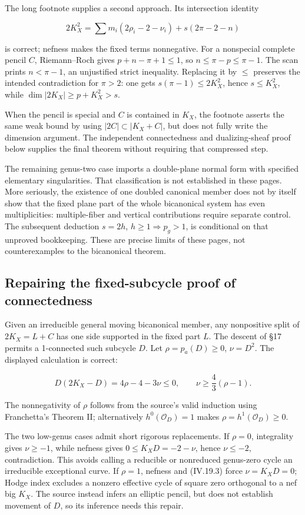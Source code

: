 The long footnote supplies a second approach. Its intersection identity

\[
2K_X^2=\sum m_i(2\rho_i-2-\nu_i)
+s(2\pi-2-n)
\]

is correct; nefness makes the fixed terms nonnegative. For a nonspecial complete pencil \(C\), Riemann--Roch gives \(p+n-\pi+1\le 1\), so \(n\le\pi-p\le\pi-1\). The scan prints \(n<\pi-1\), an unjustified strict inequality. Replacing it by \(\le\) preserves the intended contradiction for \(\pi>2\): one gets \(s(\pi-1)\le 2 K_X^2\), hence \(s\le K_X^2\), while \(\dim|2 K_X|\ge p+K_X^2>s\).

When the pencil is special and \(C\) is contained in \(K_X\), the footnote asserts the same weak bound by using \(|2C|\subset|K_X+C|\), but does not fully write the dimension argument. The independent connectedness and dualizing-sheaf proof below supplies the final theorem without requiring that compressed step.

The remaining genus-two case imports a double-plane normal form with specified elementary singularities. That classification is not established in these pages. More seriously, the existence of one doubled canonical member does not by itself show that the fixed plane part of the whole bicanonical system has even multiplicities: multiple-fiber and vertical contributions require separate control. The subsequent deduction \(s=2 h\), \(h\ge 1\Rightarrow p_g>1\), is conditional on that unproved bookkeeping. These are precise limits of these pages, not counterexamples to the bicanonical theorem.

\subsection{Repairing the fixed-subcycle proof of connectedness}

Given an irreducible general moving bicanonical member, any nonpositive split of \(2 K_X=L+C\) has one side supported in the fixed part \(L\). The descent of §17 permits a 1-connected such subcycle \(D\). Let \(\rho=p_a(D)\ge 0\), \(\nu=D^2\). The displayed calculation is correct:

\[
D(2K_X-D)=4\rho-4-3\nu\le0,
\qquad \nu\ge\frac43(\rho-1).
\tag{IV.19.3}
\]

The nonnegativity of \(\rho\) follows from the source's valid induction using Franchetta's Theorem II; alternatively \(h^0(\mathcal O_D)=1\) makes \(\rho=h^1(\mathcal O_D)\ge 0\).

The two low-genus cases admit short rigorous replacements. If \(\rho=0\), integrality gives \(\nu\ge-1\), while nefness gives \(0\le K_X D=-2-\nu\), hence \(\nu\le-2\), contradiction. This avoids calling a reducible or nonreduced genus-zero cycle an irreducible exceptional curve. If \(\rho=1\), nefness and (IV.19.3) force \(\nu=K_X D=0\); Hodge index excludes a nonzero effective cycle of square zero orthogonal to a nef big \(K_X\). The source instead infers an elliptic pencil, but does not establish movement of \(D\), so its inference needs this repair.

